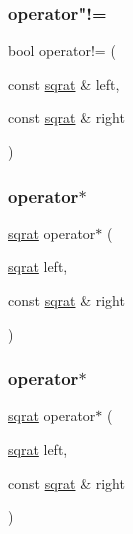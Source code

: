 \mbox{\label{classsqrat_ae100dba56606c0cfbbe45c04ae9f462a}} 
\subsubsection{\texorpdfstring{operator"!=}{operator!=}\hspace{0.1cm}{\footnotesize\ttfamily [3/3]}}
{\footnotesize\ttfamily bool operator!= (\begin{DoxyParamCaption}\item[{const \mbox{\hyperlink{classsqrat}{sqrat}} \&}]{left,  }\item[{const \mbox{\hyperlink{classsqrat}{sqrat}} \&}]{right }\end{DoxyParamCaption})\hspace{0.3cm}{\ttfamily [friend]}}

\mbox{\label{classsqrat_a0f75e7f8b43c76214b0845eadbfbfe6b}} 
\subsubsection{\texorpdfstring{operator$\ast$}{operator*}\hspace{0.1cm}{\footnotesize\ttfamily [1/3]}}
{\footnotesize\ttfamily \mbox{\hyperlink{classsqrat}{sqrat}} operator$\ast$ (\begin{DoxyParamCaption}\item[{\mbox{\hyperlink{classsqrat}{sqrat}}}]{left,  }\item[{const \mbox{\hyperlink{classsqrat}{sqrat}} \&}]{right }\end{DoxyParamCaption})\hspace{0.3cm}{\ttfamily [friend]}}

\mbox{\label{classsqrat_a0f75e7f8b43c76214b0845eadbfbfe6b}} 
\subsubsection{\texorpdfstring{operator$\ast$}{operator*}\hspace{0.1cm}{\footnotesize\ttfamily [2/3]}}
{\footnotesize\ttfamily \mbox{\hyperlink{classsqrat}{sqrat}} operator$\ast$ (\begin{DoxyParamCaption}\item[{\mbox{\hyperlink{classsqrat}{sqrat}}}]{left,  }\item[{const \mbox{\hyperlink{classsqrat}{sqrat}} \&}]{right }\end{DoxyParamCaption})\hspace{0.3cm}{\ttfamily [friend]}}

